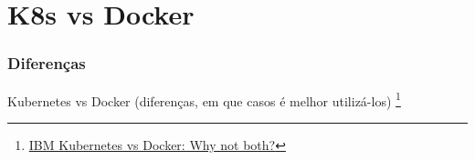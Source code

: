 \section{K8s vs Docker}

\begin{frame}
\frametitle{Diferenças}
Kubernetes vs Docker (diferenças, em que casos é melhor utilizá-los)
\footnote{\href{https://www.ibm.com/cloud/blog/kubernetes-vs-docker}{IBM Kubernetes vs Docker: Why not both?}}
\end{frame}


